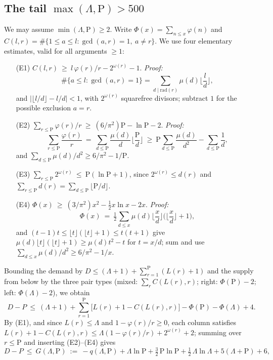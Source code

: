 \documentclass[11pt]{article}
\theoremstyle{definition}
\begin{document}
\subsection{\texorpdfstring{The tail $\max(\Lambda,\mathrm{P})>500$}{The tail max(Lambda,P) > 500}}\label{subsec:tail}
We may assume $\min(\Lambda,\mathrm{P})\ge2$. Write $\Phi(x)=\sum_{n\le x}\varphi(n)$ and $C(l,r)=\#\{1\le a\le l:\gcd(a,r)=1,\ a\ne r\}$. We use four elementary estimates, valid for all arguments $\ge 1$:
\begin{itemize}
\item[(E1)] $C(l,r)\ \ge\ l\,\varphi(r)/r-2^{\omega(r)}-1$. \emph{Proof:}
\[ \#\{a\le l:\gcd(a,r)=1\}=\sum_{d\mid \mathrm{rad}(r)}\mu(d)\Big\lfloor \frac ld\Big\rfloor, \]
and $|\lfloor l/d\rfloor-l/d|<1$, with $2^{\omega(r)}$ squarefree divisors; subtract $1$ for the possible exclusion $a=r$.
\item[(E2)] $\displaystyle\sum_{r\le \mathrm{P}}\varphi(r)/r\ \ge\ (6/\pi^2)\mathrm{P}-\ln \mathrm{P}-2$. \emph{Proof:}
\[ \sum_{r\le \mathrm{P}}\frac{\varphi(r)}{r}\ =\ \sum_{d\le \mathrm{P}}\frac{\mu(d)}{d}\Big\lfloor \frac{\mathrm{P}}{d}\Big\rfloor\ \ge\ \mathrm{P}\sum_{d\le \mathrm{P}}\frac{\mu(d)}{d^2}-\sum_{d\le \mathrm{P}}\frac1d, \]
and $\sum_{d\le \mathrm{P}}\mu(d)/d^2\ge 6/\pi^2-1/\mathrm{P}$.
\item[(E3)] $\displaystyle\sum_{r\le \mathrm{P}}2^{\omega(r)}\ \le\ \mathrm{P}(\ln \mathrm{P}+1)$, since $2^{\omega(r)}\le d(r)$ and $\sum_{r\le \mathrm{P}}d(r)=\sum_{d\le \mathrm{P}}\lfloor \mathrm{P}/d\rfloor$.
\item[(E4)] $\Phi(x)\ \ge\ (3/\pi^2)x^2-\tfrac12 x\ln x-2x$. \emph{Proof:}
\[ \Phi(x)\ =\ \tfrac12\sum_{d\le x}\mu(d)\Big\lfloor \frac xd\Big\rfloor\Big(\Big\lfloor \frac xd\Big\rfloor+1\Big), \]
and $(t-1)t\le\lfloor t\rfloor(\lfloor t\rfloor+1)\le t(t+1)$ give $\mu(d)\lfloor t\rfloor(\lfloor t\rfloor+1)\ge \mu(d)t^2-t$ for $t=x/d$; sum and use $\sum_{d\le x}\mu(d)/d^2\ge 6/\pi^2-1/x$.
\end{itemize}
Bounding the demand by $D\le(\Lambda+1)+\sum_{r=1}^{\mathrm{P}}(L(r)+1)$ and the supply from below by the three pair types (mixed: $\sum_r C(L(r),r)$; right: $\Phi(\mathrm{P})-2$; left: $\Phi(\Lambda)-2$), we obtain
\[ D-P\ \le\ (\Lambda+1)+\sum_{r=1}^{\mathrm{P}}\bigl[L(r)+1-C(L(r),r)\bigr]-\Phi(\mathrm{P})-\Phi(\Lambda)+4 .\]
By (E1), and since $L(r)\le\Lambda$ and $1-\varphi(r)/r\ge0$, each column satisfies $L(r)+1-C(L(r),r)\le \Lambda(1-\varphi(r)/r)+2^{\omega(r)}+2$; summing over $r\le\mathrm{P}$ and inserting (E2)--(E4) gives
\begin{equation}\label{eq:G}
 D-P\ \le\ G(\Lambda,\mathrm{P})\ :=\ -q(\Lambda,\mathrm{P})+\Lambda\ln \mathrm{P}+\tfrac32\,\mathrm{P}\ln \mathrm{P}+\tfrac12\,\Lambda\ln\Lambda+5(\Lambda+\mathrm{P})+6,
\end{equation}
\end{document}
